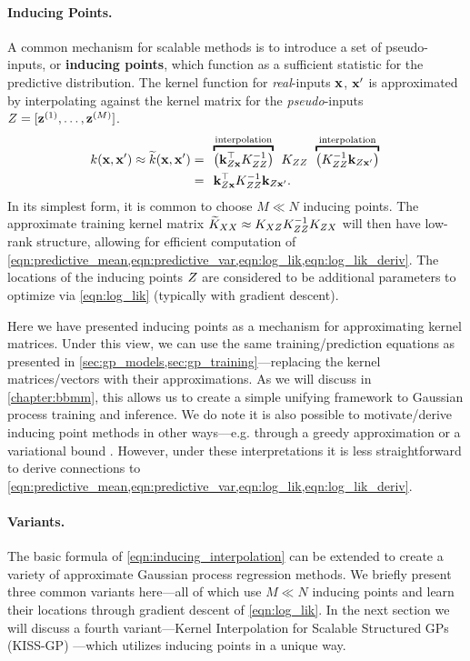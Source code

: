 \paragraph{Inducing Points.}
A common mechanism for scalable methods is to introduce a set of pseudo-inputs, or {\bf inducing points}, which function as a sufficient statistic for the predictive distribution.
The kernel function for \emph{real}-inputs $\mathbf{x}$, $\mathbf{x}'$ is approximated by interpolating against the kernel matrix for the \emph{pseudo}-inputs $Z = [\mathbf{z}^{(1)}, \ldots, \mathbf{z}^{(M)}]$.
%
\begin{align}
  k(\bx, \bx') \approx \widetilde k(\bx, \bx') &= \:\:
		\overbracket{ \left( \bk_{\bZ\bx}^\top \bK_{\bZ\bZ}^{-1} \right) }^{\text{interpolation}} \:\: \bK_{\bZ\bZ} \:\:
		\overbracket{ \left( \bK_{\bZ\bZ}^{-1} \bk_{\bZ\bx'} 		 \right) }^{\text{interpolation}}
	\nonumber{} \\
	&= \:\:
	\bk_{\bZ\bx}^\top \bK_{\bZ\bZ}^{-1} \bk_{\bZ\bx'}.
	\label{eqn:inducing_interpolation}
\end{align}
%
In its simplest form, it is common to choose $M \ll N$ inducing points.
The approximate training kernel matrix $\widetilde {K}_{XX} \approx K_{XZ} K_{ZZ}^{-1} K_{ZX}$ will then have low-rank structure, allowing for efficient computation of \cref{eqn:predictive_mean,eqn:predictive_var,eqn:log_lik,eqn:log_lik_deriv}.
The locations of the inducing points $Z$ are considered to be additional parameters to optimize via \cref{eqn:log_lik} (typically with gradient descent).

Here we have presented inducing points as a mechanism for approximating kernel matrices.
Under this view, we can use the same training/prediction equations as presented in \cref{sec:gp_models,sec:gp_training}---replacing the kernel matrices/vectors with their approximations.
As we will discuss in \cref{chapter:bbmm}, this allows us to create a simple unifying framework to Gaussian process training and inference.
We do note it is also possible to motivate/derive inducing point methods in other ways---e.g. through a greedy approximation \cite{smola2001sparse} or a variational bound \cite{titsias2009variational,hensman2013gaussian}.
However, under these interpretations it is less straightforward to derive connections to \cref{eqn:predictive_mean,eqn:predictive_var,eqn:log_lik,eqn:log_lik_deriv}.

\paragraph{Variants.}
The basic formula of \cref{eqn:inducing_interpolation} can be extended to create a variety of approximate Gaussian process regression methods.
We briefly present three common variants here---all of which use $M \ll N$ inducing points and learn their locations through gradient descent of \cref{eqn:log_lik}.
In the next section we will discuss a fourth variant---Kernel Interpolation for Scalable Structured GPs (KISS-GP) \cite{wilson2015kernel}---which utilizes inducing points in a unique way.

